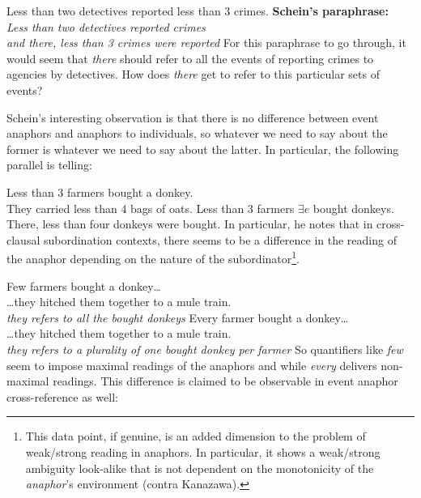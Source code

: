 \documentclass[english]{article}
\newcommand{\fg}{\color{darkred}}
\begin{document}
\pex
\a 
Less than two detectives reported less than 3 crimes. 
\a \textbf{Schein's paraphrase:}\\
\emph{
Less than two detectives reported crimes\\
and there, less than 3 crimes were reported
}
\xe
%
For this paraphrase to go through, it would seem that \emph{there} should refer to all the events of reporting crimes to agencies by detectives. How does \emph{there} get to refer to this particular sets of events?

Schein's interesting observation is that there is no difference between event anaphors and anaphors to individuals, so whatever we need to say about the former is whatever we need to say about the latter. In particular, the following parallel is telling:

\pex
\a 
{\color{darkorange!84!black} Less than 3 farmers} bought {\fg a donkey}.\\
{\color{purple!93!black} They} carried {\color{bluegray!93!black} less than 4 bags of oats}.
\a 
{\color{darkorange!84!black} Less than 3 farmers} {\fg $\exists e$} bought donkeys.\\
{\color{purple!93!black} There,} {\color{bluegray!93!black} less than four donkeys} were bought.
\xe
%
In particular, he notes that in cross-clausal subordination contexts, there seems to be a difference in the reading of the anaphor depending on the nature of the subordinator\footnote{This data point, if genuine, is an added dimension to the problem of weak/strong reading in anaphors. In particular, it shows a weak/strong ambiguity look-alike that is not dependent on the monotonicity of the \emph{anaphor}'s environment (contra Kanazawa).}.

\pex
\a 
Few farmers bought a donkey\ldots\\
\ldots they hitched them together to a mule train.\\
\emph{they refers to all the bought donkeys}
\a 
Every farmer bought a donkey\ldots\\
\ldots they hitched them together to a mule train.\\
\emph{they refers to a plurality of one bought donkey per farmer}
\xe
%
So quantifiers like \emph{few} seem to impose maximal readings of the anaphors and while \emph{every} delivers non-maximal readings. This difference is claimed to be observable in event anaphor cross-reference as well:
\end{document}
